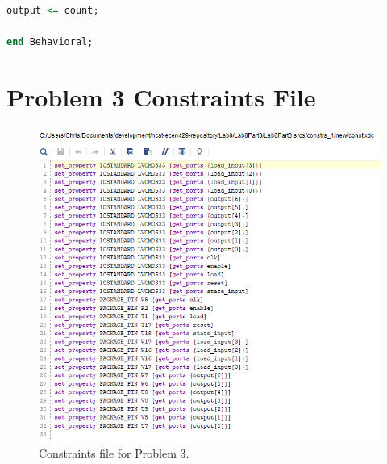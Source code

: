 \documentclass[11pt]{article}
\begin{document}
\begin{appendices}
\begin{lstlisting}[language=VHDL]
    output <= count;

end Behavioral;
\end{lstlisting}

\section{Problem 3 Constraints File}
\begin{center}
\begin{figure}[H]
	\includegraphics[scale=1]{./images/const3.png}
	\caption{\label{fig:Prob3Const}Constraints file for Problem 3.}
\end{figure}
\end{center}

\end{appendices}
\end{document}
